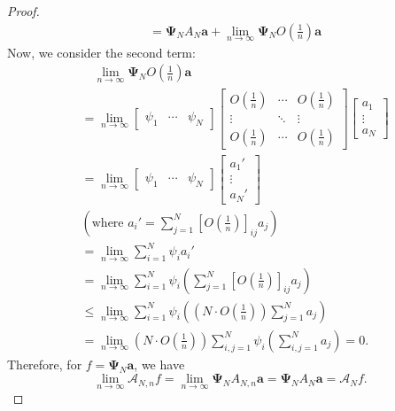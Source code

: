 \documentclass{article}[11]
\begin{document}
\begin{proof}
\begin{align*}
			&= \mathbf{\Psi}_N A_N \mathbf{a} + \lim_{n\to\infty} \mathbf{\Psi}_N O(\tfrac{1}{n})\mathbf{a}
		\end{align*}
		Now, we consider the second term:
		\begin{align*}
			&\quad \lim_{n\to\infty} \mathbf{\Psi}_N O(\tfrac{1}{n})\mathbf{a} \\
			&= \lim_{n\to\infty} 
			\begin{bmatrix}
				\psi_1 & \cdots & \psi_N
			\end{bmatrix}
			\begin{bmatrix}
				O(\tfrac{1}{n}) & \cdots & O(\tfrac{1}{n}) \\
				\vdots & \ddots & \vdots \\
				O(\tfrac{1}{n}) & \cdots & O(\tfrac{1}{n})
			\end{bmatrix}
			\begin{bmatrix}
				a_1 \\
				\vdots \\
				a_N
			\end{bmatrix} \\
			&= \lim_{n\to\infty} 
			\begin{bmatrix}
				\psi_1 & \cdots & \psi_N
			\end{bmatrix}
			\begin{bmatrix}
				a_1' \\
				\vdots \\
				a_N'
			\end{bmatrix} \\
			&(\text{where $a_i'=\sum_{j=1}^N [O(\tfrac{1}{n})]_{ij}a_j$}) \\
			&= \lim_{n\to\infty} \sum_{i=1}^N \psi_i a_i' \\
			&= \lim_{n\to\infty} \sum_{i=1}^N \psi_i \left( \sum_{j=1}^N [O(\tfrac{1}{n})]_{ij}a_j \right) \\
			&\leq \lim_{n\to\infty} \sum_{i=1}^N \psi_i \left( \left(N \cdot O(\tfrac{1}{n})\right) \sum_{j=1}^N a_j \right) \\
			&= \lim_{n\to\infty} \left(N \cdot O(\tfrac{1}{n})\right) \sum_{i,j=1}^N \psi_i \left( \sum_{i,j=1}^N a_j \right) = 0.
		\end{align*}
		Therefore, for $f=\mathbf{\Psi}_N\mathbf{a}$, we have
		$$
		\lim_{n\to\infty} \mathcal{A}_{N,n}f = \lim_{n\to\infty} \mathbf{\Psi}_N A_{N,n} \mathbf{a} = \mathbf{\Psi}_N A_N \mathbf{a} = \mathcal{A}_N f.
		$$
	\end{proof}
	
	
	\newpage
\end{document}

